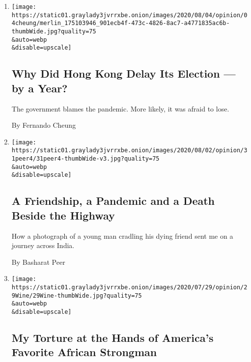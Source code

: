 \begin{enumerate}
\def\labelenumi{\arabic{enumi}.}
\item
  \href{/2020/08/02/opinion/hong-kong-election-china.html}{}

  \texttt{[image: https://static01.graylady3jvrrxbe.onion/images/2020/08/04/opinion/04cheung/merlin\_175103946\_901ecb4f-473c-4826-8ac7-a4771835ac6b-thumbWide.jpg?quality=75\\\&auto=webp\\\&disable=upscale]}

  \hypertarget{why-did-hong-kong-delay-its-election--by-a-year}{%
  \subsection{Why Did Hong Kong Delay Its Election --- by a
  Year?}\label{why-did-hong-kong-delay-its-election--by-a-year}}

  The government blames the pandemic. More likely, it was afraid to
  lose.

  By Fernando Cheung
\item
  \href{/2020/07/31/opinion/sunday/India-migration-coronavirus.html}{}

  \texttt{[image: https://static01.graylady3jvrrxbe.onion/images/2020/08/02/opinion/31peer4/31peer4-thumbWide-v3.jpg?quality=75\\\&auto=webp\\\&disable=upscale]}

  \hypertarget{a-friendship-a-pandemic-and-a-death-beside-the-highway}{%
  \subsection{A Friendship, a Pandemic and a Death Beside the
  Highway}\label{a-friendship-a-pandemic-and-a-death-beside-the-highway}}

  How a photograph of a young man cradling his dying friend sent me on a
  journey across India.

  By Basharat Peer
\item
  \href{/2020/07/29/opinion/uganda-museveni-repression.html}{}

  \texttt{[image: https://static01.graylady3jvrrxbe.onion/images/2020/07/29/opinion/29Wine/29Wine-thumbWide.jpg?quality=75\\\&auto=webp\\\&disable=upscale]}

  \hypertarget{my-torture-at-the-hands-of-americas-favorite-african-strongman}{%
  \subsection{My Torture at the Hands of America's Favorite African
  Strongman}\label{my-torture-at-the-hands-of-americas-favorite-african-strongman}}


\end{enumerate}
